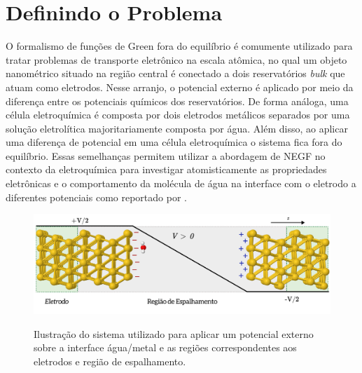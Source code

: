 \section{Definindo o Problema\label{sec:problema}}

O formalismo de funções de Green fora do equilíbrio é comumente utilizado para tratar problemas de transporte eletrônico na escala atômica, no qual um objeto nanométrico situado na região central é conectado a dois reservatórios \textit{bulk} que atuam como eletrodos. Nesse arranjo, o potencial externo é aplicado por meio da diferença entre os potenciais químicos dos reservatórios. De forma análoga, uma célula eletroquímica é composta por dois eletrodos metálicos separados por uma solução eletrolítica majoritariamente composta por água. Além disso, ao aplicar uma diferença de potencial em uma célula eletroquímica o sistema fica fora do equilíbrio. Essas semelhanças permitem utilizar a abordagem de NEGF no contexto da eletroquímica para investigar atomisticamente as propriedades eletrônicas e o comportamento da molécula de água na interface com o eletrodo a diferentes potenciais como reportado por \citeauthor{artigo-luana}. 
\begin{figure}[t!]
	\centering
	\caption{Ilustração do sistema utilizado para aplicar um potencial externo sobre a interface água/metal e as regiões correspondentes aos eletrodos e região de espalhamento.}
	\includegraphics[scale=0.33]{figs/sistema_negf.png}
	\label{fig:celula}
\end{figure}

